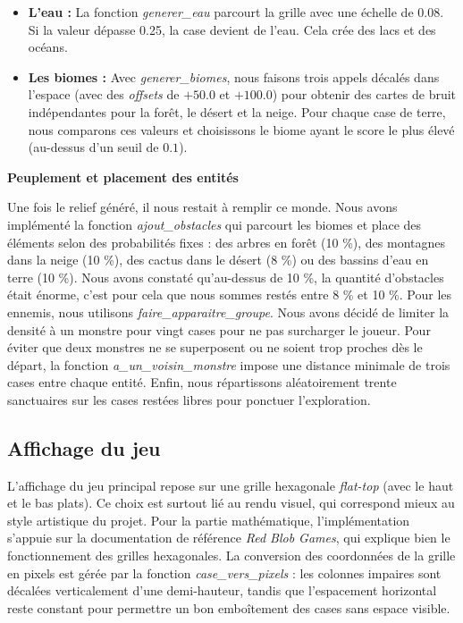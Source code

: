 \documentclass[11pt,a4paper]{article}
\begin{document}
\begin{itemize}
    \item \textbf{L'eau :} La fonction \emph{generer\_eau} parcourt la grille avec une échelle de 0.08. Si la valeur dépasse 0.25, la case devient de l'eau. Cela crée des lacs et des océans.
    \item \textbf{Les biomes :} Avec \emph{generer\_biomes}, nous faisons trois appels décalés dans l'espace (avec des \emph{offsets} de $+50.0$ et $+100.0$) pour obtenir des cartes de bruit indépendantes pour la forêt, le désert et la neige. Pour chaque case de terre, nous comparons ces valeurs et choisissons le biome ayant le score le plus élevé (au-dessus d'un seuil de $0.1$).
\end{itemize}

\medskip
\noindent\textbf{Peuplement et placement des entités}

\noindent Une fois le relief généré, il nous restait à remplir ce monde. Nous avons implémenté la fonction \emph{ajout\_obstacles} qui parcourt les biomes et place des éléments selon des probabilités fixes : des arbres en forêt (10 \%), des montagnes dans la neige (10 \%), des cactus dans le désert (8 \%) ou des bassins d'eau en terre (10 \%). Nous avons constaté qu'au-dessus de 10 \%, la quantité d'obstacles était énorme, c'est pour cela que nous sommes restés entre 8 \% et 10 \%.
Pour les ennemis, nous utilisons \emph{faire\_apparaitre\_groupe}. Nous avons décidé de limiter la densité à un monstre pour vingt cases pour ne pas surcharger le joueur. Pour éviter que deux monstres ne se superposent ou ne soient trop proches dès le départ, la fonction \emph{a\_un\_voisin\_monstre} impose une distance minimale de trois cases entre chaque entité. Enfin, nous répartissons aléatoirement trente sanctuaires sur les cases restées libres pour ponctuer l'exploration.

\subsection{Affichage du jeu}

L’affichage du jeu principal repose sur une grille hexagonale \textit{flat-top} (avec le haut et le bas plats). Ce choix est surtout lié au rendu visuel, qui correspond mieux au style artistique du projet.
Pour la partie mathématique, l’implémentation s’appuie sur la documentation de référence \textit{Red Blob Games}, qui explique bien le fonctionnement des grilles hexagonales. 
La conversion des coordonnées de la grille en pixels est gérée par la fonction \emph{case\_vers\_pixels} : les colonnes impaires sont décalées verticalement d’une demi-hauteur, tandis que l’espacement horizontal reste constant pour permettre un bon emboîtement des cases sans espace visible.
\end{document}

